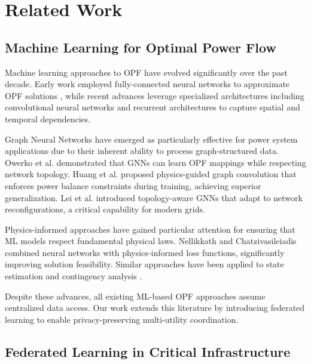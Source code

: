 \documentclass[journal,10pt]{IEEEtran}
\begin{document}
\section{Related Work}

\subsection{Machine Learning for Optimal Power Flow}

Machine learning approaches to OPF have evolved significantly over the past decade. Early work employed fully-connected neural networks to approximate OPF solutions \cite{gupta2022controlling}, while recent advances leverage specialized architectures including convolutional neural networks \cite{pan2021deepopf} and recurrent architectures \cite{thams2019recurrent} to capture spatial and temporal dependencies.

Graph Neural Networks have emerged as particularly effective for power system applications due to their inherent ability to process graph-structured data. Owerko et al. \cite{owerko2020optimal} demonstrated that GNNs can learn OPF mappings while respecting network topology. Huang et al. \cite{huang2023physics} proposed physics-guided graph convolution that enforces power balance constraints during training, achieving superior generalization. Lei et al. \cite{lei2023topology} introduced topology-aware GNNs that adapt to network reconfigurations, a critical capability for modern grids.

Physics-informed approaches have gained particular attention for ensuring that ML models respect fundamental physical laws. Nellikkath and Chatzivasileiadis \cite{nellikkath2022physics} combined neural networks with physics-informed loss functions, significantly improving solution feasibility. Similar approaches have been applied to state estimation \cite{pagnier2022physics} and contingency analysis \cite{donnot2019leap}.

Despite these advances, all existing ML-based OPF approaches assume centralized data access. Our work extends this literature by introducing federated learning to enable privacy-preserving multi-utility coordination.

\subsection{Federated Learning in Critical Infrastructure}
\end{document}
